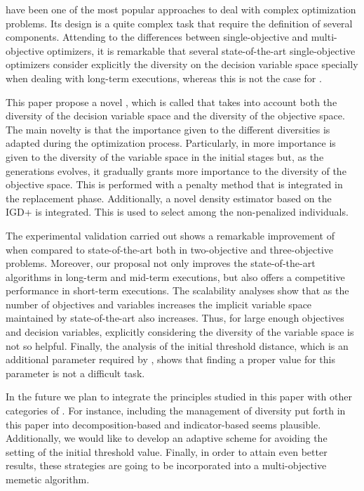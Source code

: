 \EAS{} have been one of the most popular approaches to deal with complex optimization problems.
%
Its design is a quite complex task that require the definition of several components.
%
Attending to the differences between single-objective and multi-objective optimizers, it is remarkable
that several state-of-the-art single-objective optimizers consider explicitly the diversity on the decision variable space specially
when dealing with long-term executions, whereas this is not the case for \MOEAS{}.
%
%
%

This paper propose a novel \MOEA{}, which is called \VSDMOEA{} that takes into account both the diversity of the decision variable space
and the diversity of the objective space.
%
The main novelty is that the importance given to the different diversities is adapted during the optimization process.
%
Particularly, in \VSDMOEA{} more importance is given to the diversity of the variable space in the initial stages
but, as the generations evolves, it gradually grants more importance to the diversity of the objective space.
%
This is performed with a penalty method that is integrated in the replacement phase.
%
Additionally, a novel density estimator based on the IGD+ is integrated.
%
This is used to select among the non-penalized individuals.

The experimental validation carried out shows a remarkable improvement of \VSDMOEA{} when compared to state-of-the-art \MOEAS{} both in
two-objective and three-objective problems.
%
Moreover, our proposal not only improves the state-of-the-art algorithms in long-term and mid-term executions,
but also offers a competitive performance in short-term executions.
%
The scalability analyses show that as the number of objectives and variables increases the implicit variable space maintained by state-of-the-art
\MOEAS{} also increases.
%
Thus, for large enough objectives and decision variables, explicitly considering the diversity of the variable space is not so helpful.
%
Finally, the analysis of the initial threshold distance, which is an additional parameter required by \VSDMOEA{}, shows that finding a proper
value for this parameter is not a difficult task.

In the future we plan to integrate the principles studied in this paper with other categories of \MOEAS{}.
%
For instance, including the management of diversity put forth in this paper into decomposition-based and indicator-based \MOEAS{} seems plausible.
%
Additionally, we would like to develop an adaptive scheme for avoiding the setting of the initial threshold value.
%
Finally, in order to attain even better results, these strategies are going to be incorporated into a multi-objective memetic algorithm.
%
